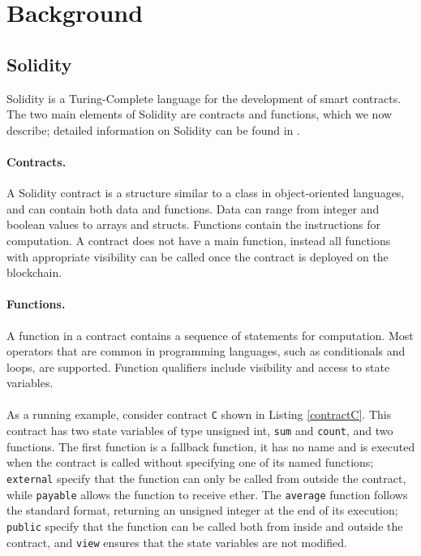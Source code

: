 \section{Background}


\subsection{Solidity}

Solidity is a Turing-Complete language for the development of smart contracts. The two main elements of Solidity are contracts and functions, which we now describe; detailed information on Solidity can be found in \cite{}. 

\paragraph{Contracts.} A Solidity contract is a structure similar to a class in object-oriented languages, and can contain both data and functions. Data can range from integer and boolean values to arrays and structs. Functions contain the instructions for computation. A contract does not have a main function, instead all functions with appropriate visibility can be called once the contract is deployed on the blockchain.

\paragraph{Functions.} A function in a contract contains a sequence of statements for computation. Most operators that are common in programming languages, such as conditionals and loops, are supported. Function qualifiers include visibility and access to state variables. 

\paragraph{} As a running example, consider contract \texttt{C} shown in Listing \ref{contractC}. This contract has two state variables of type unsigned int, \texttt{sum} and \texttt{count}, and two functions. The first function is a fallback function, it has no name and is executed when the contract is called without specifying one of its named functions; \texttt{external} specify that the function can only be called from outside the contract, while \texttt{payable} allows the function to receive ether. The \texttt{average} function follows the standard format, returning an unsigned integer at the end of its execution; \texttt{public} specify that the function can be called both from inside and outside the contract, and \texttt{view} ensures that the state variables are not modified.

